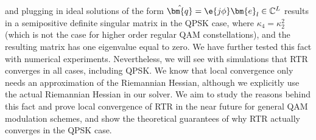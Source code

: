 and plugging in ideal solutions of the form 
$\hat{\bm{q}}=
\e{j\phi}\bm{e}_l\in\mathbb{C}^L
$ 
results in a semipositive definite singular matrix in the QPSK case, where $\kappa_4=\kappa_2^2$ (which is not the case for higher order regular QAM constellations), and the resulting matrix has one eigenvalue equal to zero. We have further tested this fact with numerical experiments. 
Nevertheless, we will see with simulations that RTR converges in all cases, including QPSK. We know that local convergence only needs an approximation of the Riemannian Hessian, although we explicitly use the actual Riemannian Hessian in our solver. We aim to study the reasons behind this fact and prove local convergence of RTR in the near future for general QAM modulation schemes, and show the theoretical guarantees of why RTR actually converges in the QPSK case.



